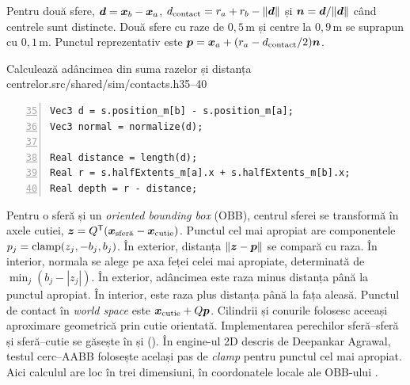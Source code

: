 \documentclass[11pt,a4paper]{article}
\begin{document}
Pentru două sfere, \(\boldsymbol{d}=\boldsymbol{x}_b-\boldsymbol{x}_a\),
\(d_{\mathrm{contact}}=r_a+r_b-\|\boldsymbol{d}\|\) și
\(\boldsymbol{n}=\boldsymbol{d}/\|\boldsymbol{d}\|\) când centrele sunt distincte.
Două sfere cu raze de \(0{,}5\,\mathrm m\) și centre la
\(0{,}9\,\mathrm m\) se suprapun cu \(0{,}1\,\mathrm m\).
Punctul reprezentativ este
\(\boldsymbol{p}=\boldsymbol{x}_a+(r_a-d_{\mathrm{contact}}/2)\boldsymbol{n}\).
\begin{codefragment}{Calculează adâncimea din suma razelor și distanța centrelor.}{src/shared/sim/contacts.h}{35--40}
\begin{lstlisting}[numbers=left,firstnumber=35]
Vec3 d = s.position_m[b] - s.position_m[a];
Vec3 normal = normalize(d);

Real distance = length(d);
Real r = s.halfExtents_m[a].x + s.halfExtents_m[b].x;
Real depth = r - distance;
\end{lstlisting}
\end{codefragment}

Pentru o sferă și un \emph{oriented bounding box} (OBB), centrul sferei se
transformă în axele cutiei,
\(\boldsymbol{z}=Q^\mathsf T(\boldsymbol{x}_{\text{sferă}}-\boldsymbol{x}_{\mathrm{cutie}})\).
Punctul cel mai apropiat are componentele
\(p_j=\operatorname{clamp}(z_j,-b_j,b_j)\). În exterior, distanța
\(\|\boldsymbol{z}-\boldsymbol{p}\|\) se compară cu raza. În interior, normala
se alege pe axa feței celei mai apropiate, determinată de
\(\min_j(b_j-|z_j|)\). În exterior, adâncimea este raza
minus distanța până la punctul apropiat. În interior, este
raza plus distanța până la fața aleasă. Punctul de contact
în \emph{world space} este \(\boldsymbol{x}_{\mathrm{cutie}}+Q\boldsymbol{p}\).
Cilindrii și conurile folosesc aceeași
aproximare geometrică prin cutie orientată.
Implementarea perechilor sferă--sferă și sferă--cutie se găsește
în  și 
().
În engine-ul 2D descris de Deepankar Agrawal, testul cerc--AABB
folosește același pas de \emph{clamp} pentru punctul cel mai
apropiat. Aici calculul are loc în trei dimensiuni, în coordonatele
locale ale OBB-ului \cite{medium-clamp}.
\end{document}
